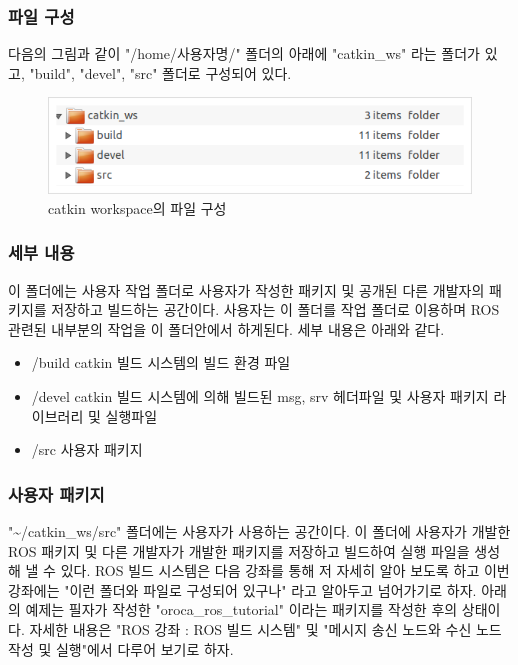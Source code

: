 \subsubsection{파일 구성}

다음의 그림과 같이 "/home/사용자명/" 폴더의 아래에 "catkin\_ws" 라는 폴더가 있고, "build", "devel", "src" 폴더로 구성되어 있다. 

\begin{figure}[h]
\centering\includegraphics[width=0.5\columnwidth]{pictures/chapter4/folder_catkin_ws.png}
\caption{catkin workspace의 파일 구성}
\end{figure}

\subsubsection{세부 내용}

이 폴더에는 사용자 작업 폴더로 사용자가 작성한 패키지 및 공개된 다른 개발자의 패키지를 저장하고 빌드하는 공간이다. 사용자는 이 폴더를 작업 폴더로 이용하며 ROS 관련된 내부분의 작업을 이 폴더안에서 하게된다. 세부 내용은 아래와 같다.

\begin{itemize}
\item /build catkin 빌드 시스템의 빌드 환경 파일
\item /devel catkin 빌드 시스템에 의해 빌드된 msg, srv 헤더파일 및 사용자 패키지 라이브러리 및 실행파일
\item /src 사용자 패키지
\end{itemize}

\subsubsection{사용자 패키지}

"\textasciitilde/catkin\_ws/src" 폴더에는 사용자가 사용하는 공간이다. 이 폴더에 사용자가 개발한 ROS 패키지 및 다른 개발자가 개발한 패키지를 저장하고 빌드하여 실행 파일을 생성해 낼 수 있다. ROS 빌드 시스템은 다음 강좌를 통해 저 자세히 알아 보도록 하고 이번 강좌에는 "이런 폴더와 파일로 구성되어 있구나" 라고 알아두고 넘어가기로 하자. 아래의 예제는 필자가 작성한 "oroca\_ros\_tutorial" 이라는 패키지를 작성한 후의 상태이다. 자세한 내용은 "ROS 강좌 : ROS 빌드 시스템" 및 "메시지 송신 노드와 수신 노드 작성 및 실행"에서 다루어 보기로 하자.

